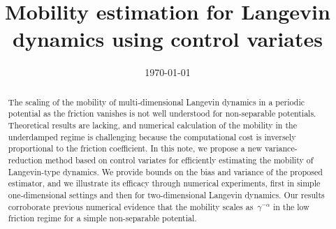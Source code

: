 \documentclass[11pt,a4paper]{article}
\date{\today}
\title{Mobility estimation for Langevin dynamics using control variates}
\author{%
}
\theoremstyle{plain}
\numberwithin{equation}{section}
\begin{document}
\maketitle

\begin{abstract}
    The scaling of the mobility of multi-dimensional Langevin dynamics in a periodic potential as the friction vanishes is not well understood for non-separable potentials.
    Theoretical results are lacking,
    and numerical calculation of the mobility in the underdamped regime is challenging because
    the computational cost is inversely proportional to the friction coefficient.
    In this note, we propose a new variance-reduction method based on control variates for efficiently estimating the mobility of Langevin-type dynamics.
    We provide bounds on the bias and variance of the proposed estimator,
    and we illustrate its efficacy through numerical experiments,
    first in simple one-dimensional settings
    and then for two-dimensional Langevin dynamics.
    Our results corroborate previous numerical evidence that
    the mobility scales as~$\gamma^{-\alpha}$ in the low friction regime for a simple non-separable potential.
\end{abstract}
\end{document}
